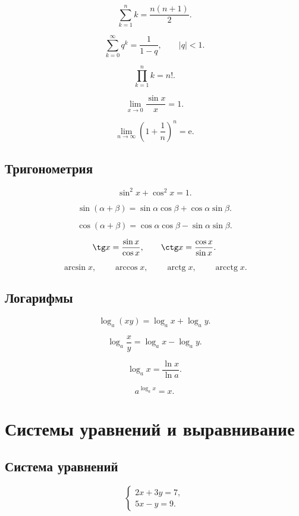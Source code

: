 \documentclass[12pt,a4paper]{article}
\theoremstyle{definition}
\theoremstyle{remark}
\newcommand{\abs}[1]{\left|#1\right|}
\newcommand{\e}{\mathrm{e}}
\DeclareMathOperator{\arctg}{arctg}
\DeclareMathOperator{\arcctg}{arcctg}
\begin{document}
\[
    \sum_{k=1}^{n} k
    =
    \frac{n(n+1)}{2}.
\]

\[
    \sum_{k=0}^{\infty} q^k
    =
    \frac{1}{1-q},
    \qquad
    \abs{q}<1.
\]

\[
    \prod_{k=1}^{n} k=n!.
\]

\[
    \lim_{x\to 0}\frac{\sin x}{x}=1.
\]

\[
    \lim_{n\to\infty}
    \left(1+\frac{1}{n}\right)^n
    =
    \e.
\]

\subsection{Тригонометрия}

\[
    \sin^2 x+\cos^2 x=1.
\]

\[
    \sin(\alpha+\beta)
    =
    \sin\alpha\cos\beta
    +
    \cos\alpha\sin\beta.
\]

\[
    \cos(\alpha+\beta)
    =
    \cos\alpha\cos\beta
    -
    \sin\alpha\sin\beta.
\]

\[
    \tg x=\frac{\sin x}{\cos x},
    \qquad
    \ctg x=\frac{\cos x}{\sin x}.
\]

\[
    \arcsin x,\qquad
    \arccos x,\qquad
    \arctg x,\qquad
    \arcctg x.
\]

\subsection{Логарифмы}

\[
    \log_a(xy)=\log_a x+\log_a y.
\]

\[
    \log_a\frac{x}{y}
    =
    \log_a x-\log_a y.
\]

\[
    \log_a x
    =
    \frac{\ln x}{\ln a}.
\]

\[
    a^{\log_a x}=x.
\]


\section{Системы уравнений и выравнивание}

\subsection{Система уравнений}

\[
\begin{cases}
    2x+3y=7,\\
    5x-y=9.
\end{cases}
\]
\end{document}
